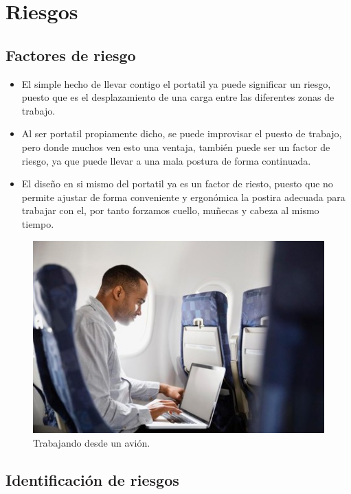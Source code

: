 \documentclass{article}
\begin{document}
    \section{Riesgos}
      \subsection{Factores de riesgo}
      \begin{itemize}
        \item El simple hecho de llevar contigo el portatil ya puede significar un riesgo, puesto que es el desplazamiento de una carga entre las diferentes zonas 
        de trabajo.
        \item Al ser portatil propiamente dicho, se puede improvisar el puesto de trabajo, pero donde muchos ven esto una ventaja, también puede ser un factor de 
        riesgo, ya que puede llevar a una mala postura de forma continuada.
        \item El diseño en si mismo del portatil ya es un factor de riesto, puesto que no permite ajustar de forma conveniente y ergonómica la postira adecuada 
        para trabajar con el, por tanto forzamos cuello, muñecas y cabeza al mismo tiempo.
      \end{itemize}
        
      \begin{figure}[h] 
        \centering
        \includegraphics{img/avion.jpg}
        \caption{Trabajando desde un avión.}
      \end{figure}

  \newpage
    \subsection{Identificación de riesgos}
      
\end{document}
